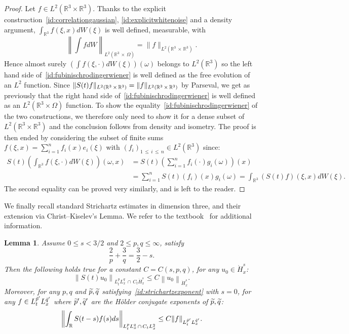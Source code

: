 \documentclass[10pt]{amsart}
\newtheorem{lemm}[theo]{Lemma}\newtheorem{prop}[theo]{Proposition}\newtheorem{coro}[theo]{Corollary}\newtheorem{conj}[theo]{Conjecture}
\theoremstyle{definition}\newtheorem{defi}[theo]{Definition}\newtheorem{rema}[theo]{Remark}\newtheorem{exam}[theo]{Example}\newtheorem{exem}[theo]{Example}\newtheorem{nota}[theo]{Notation}
\newcommand{\R}{\mathbb{R}}
\let\oldtilde\tilde
\renewcommand*{\tilde}[1]{\mathchoice{\widetilde{#1}}{\widetilde{#1}}{\oldtilde{#1}}{\oldtilde{#1}}}
\begin{document}
\begin{proof}
Let $f\in L^2(\R^3\times \R^3)$. Thanks to the explicit construction~\eqref{id:correlationgaussian}, \eqref{id:explicitwhitenoise} and a density argument, $\int_{\R^3} f(\xi,x)dW(\xi)$ is well defined, measurable, with 
\[
\left\|\int fdW\right\|_{L^2\left(\R^3\,\times\,\Omega\right)}=\| f \|_{L^2\left(\R^3\,\times\,\R^3\right)}.
\]
Hence almost surely $ (\int f(\xi,\cdot)dW(\xi))(\omega)$ belongs to $L^2(\R^3)$ so the left hand side of~\eqref{id:fubinischrodingerwiener} is well defined as the free evolution of an $L^2$ function. Since $\|S(t)f\|_{L^2(\R^3\,\times\,\R^3)}\linebreak =\|f\|_{L^2(\R^3\,\times\,\R^3)}$ by Parseval, we get as previously that the right hand side of~\eqref{id:fubinischrodingerwiener} is well defined as an $L^2(\R^3\times \Omega)$ function. To show the equality~\eqref{id:fubinischrodingerwiener} of the two constructions, we therefore only need to show it for a dense subset of $L^2(\R^3\times \R^3)$ and the conclusion follows from density and isometry. The proof is then ended by considering the subset of finite sums $f(\xi,x)=\sum_{i=1}^n f_i(x)e_i(\xi)$ with $(f_i)_{1\,\leq\,i\,\leq \,n} \in L^2(\R^3)$ since:
\begin{align*}
S(t) \left(\int_{\R^3} f(\xi,\cdot)dW(\xi) \right)(\omega,x)&=S(t) \left(\sum_{i=1}^n f_i(\cdot) g_i(\omega) \right)(x)\\
&=\sum_{i=1}^n S(t)(f_i)(x) g_i(\omega) = \int_{\R^3} (S(t) f)(\xi,x)dW(\xi).
\end{align*}
The second equality can be proved very similarly, and is left to the reader.
\end{proof}


We finally recall standard Strichartz estimates in dimension three, and their extension via Christ--Kiselev's Lemma. We refer to the textbook~\cite{tao} for additional information.


\begin{lemm}\label{lem:strichartz}
Assume $0\leq s<3/2$ and $2\leq p,q \leq \infty$, satisfy
\begin{equation}\label{id:strichartzexponent}
\frac2{p}+\frac3{q} = \frac 32-s.
\end{equation}
Then the following holds true for a constant $C=C(s,p,q)$, for any $u_0\in \dot H^s_x$:
\begin{equation} \label{bd:homostrichartz}
\left\| S(t)u_0\right\|_{L^p_tL^q_x\,\cap\,C_t\dot H^s_x}\leq C \left\| u_0\right\|_{\dot H^s_x}.
\end{equation}
Moreover, for any $p,q$ and $\tilde p,\tilde q$ satisfying~\eqref{id:strichartzexponent} with $s=0$, for any $f\in L^{\tilde p'}_tL^{\tilde q'}_x$ where $\tilde p',\tilde q'$ are the H\"older conjugate exponents of $\tilde p,\tilde q$:
\begin{equation} \label{bd:dualstrichartz}
\left\| \int_{\R} S(t-s)f(s)ds \right\|_{L^{p}_tL^q_x\,\cap\,C_t L^2_x}\leq C\| f\|_{L^{\tilde p'}_tL^{\tilde q'}_x}.
\end{equation}
\end{lemm}
\vspace{10pt}
\pagebreak
\end{document}

